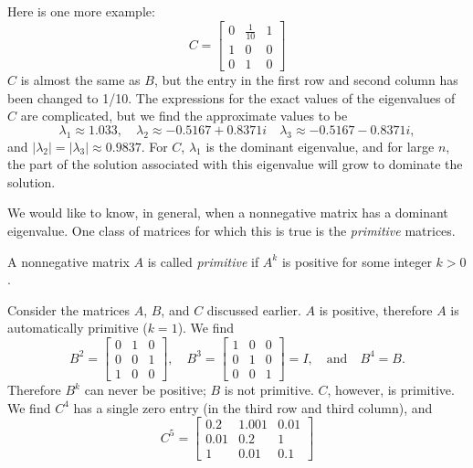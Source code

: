 Here is one more example:
\begin{equation}
   C = \begin{bmatrix}
             0 & \frac{1}{10} & 1 \\ 1 & 0 & 0 \\ 0 & 1 & 0
       \end{bmatrix}
\end{equation}
$C$ is almost the same as $B$, but the entry
in the first row and second column has been changed to 1/10.
The expressions for the exact values of the eigenvalues
of $C$ are complicated, but we find the approximate
values to be
\begin{equation}
  \lambda_1 \approx 1.033, \quad
  \lambda_2 \approx  -0.5167+0.8371i \quad
  \lambda_3 \approx  -0.5167-0.8371i,
\end{equation}
and $|\lambda_2| = |\lambda_3| \approx 0.9837$.
For $C$, $\lambda_1$ is the dominant eigenvalue, and for large
$n$, the part of the solution associated with this eigenvalue
will grow to dominate the solution.

We would like to know, in general, when a nonnegative matrix
has a dominant eigenvalue.
One class of matrices for which this is true is the
\emph{primitive} matrices.

\begin{definition}
A nonnegative matrix $A$ is called
\emph{primitive}
if $A^k$ is positive for some integer $k > 0$.
\end{definition}
Consider the matrices $A$, $B$, and $C$ discussed earlier.
$A$ is positive, therefore $A$ is automatically primitive ($k=1$).
We find
\begin{equation}
   B^2 = \begin{bmatrix}
             0 & 1 & 0 \\ 0 & 0 & 1 \\ 1 & 0 & 0
       \end{bmatrix}, \quad
   B^3 = \begin{bmatrix}
             1 & 0 & 0 \\ 0 & 1 & 0 \\ 0 & 0 & 1
       \end{bmatrix} = I, \quad \textrm{and} \quad
   B^4 = B.
\end{equation}
Therefore $B^k$ can never be positive;  $B$ is not primitive.
$C$, however, is primitive. We find $C^4$ has a single zero
entry (in the third row and third column), and
\begin{equation}
  C^5 = \begin{bmatrix}
           0.2 & 1.001 & 0.01 \\
           0.01  & 0.2 & 1 \\
           1 & 0.01 & 0.1
        \end{bmatrix}
\end{equation}


